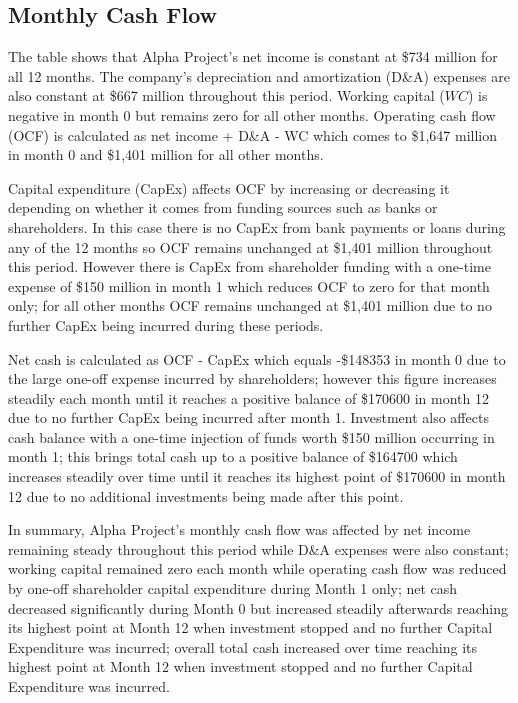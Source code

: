 

\subsection{Monthly Cash Flow}\label{sec:title}

The table shows that Alpha Project's net income is constant at \$734 million for all 12 months. The company's depreciation and amortization (D&A) expenses are also constant at \$667 million throughout this period. Working capital ($WC$) is negative in month 0 but remains zero for all other months. Operating cash flow (OCF) is calculated as net income + D&A - WC which comes to \$1,647 million in month 0 and \$1,401 million for all other months. 

Capital expenditure (CapEx) affects OCF by increasing or decreasing it depending on whether it comes from funding sources such as banks or shareholders. In this case there is no CapEx from bank payments or loans during any of the 12 months so OCF remains unchanged at \$1,401 million throughout this period. However there is CapEx from shareholder funding with a one-time expense of \$150 million in month 1 which reduces OCF to zero for that month only; for all other months OCF remains unchanged at \$1,401 million due to no further CapEx being incurred during these periods. 

Net cash is calculated as OCF - CapEx which equals -\$148353 in month 0 due to the large one-off expense incurred by shareholders; however this figure increases steadily each month until it reaches a positive balance of \$170600 in month 12 due to no further CapEx being incurred after month 1. Investment also affects cash balance with a one-time injection of funds worth \$150 million occurring in month 1; this brings total cash up to a positive balance of \$164700 which increases steadily over time until it reaches its highest point of \$170600 in month 12 due to no additional investments being made after this point. 

In summary, Alpha Project's monthly cash flow was affected by net income remaining steady throughout this period while D&A expenses were also constant; working capital remained zero each month while operating cash flow was reduced by one-off shareholder capital expenditure during Month 1 only; net cash decreased significantly during Month 0 but increased steadily afterwards reaching its highest point at Month 12 when investment stopped and no further Capital Expenditure was incurred; overall total cash increased over time reaching its highest point at Month 12 when investment stopped and no further Capital Expenditure was incurred.